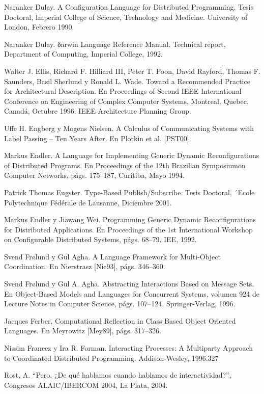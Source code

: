\begin{thebibliography}{1}
{\bibitem{}
Naranker Dulay. A Configuration Language for Distributed Programming.
Tesis Doctoral, Imperial College of Science, Technology and Medicine. University
of London, Febrero 1990.

\bibitem{}
Naranker Dulay. δarwin Language Reference Manual. Technical report,
Department of Computing, Imperial College, 1992.


\bibitem{}
Walter J. Ellis, Richard F. Hilliard III, Peter T. Poon, David
Rayford, Thomas F. Saunders, Basil Sherlund y Ronald L. Wade. Toward a
Recommended Practice for Architectural Description. En Proceedings of Second
IEEE International Conference on Engineering of Complex Computer Systems,
Montreal, Quebec, Canadá, Octubre 1996. IEEE Architecture Planning Group.


\bibitem{}
Uffe H. Engberg y Mogens Nielsen. A Calculus of Communicating Systems
with Label Passing – Ten Years After. En Plotkin et al. [PST00].

\bibitem{} 
Markus Endler. A Language for Implementing Generic Dynamic
Reconfigurations of Distributed Programs. En Proceedings of the 12th Brazilian
Symposiumon Computer Networks, págs. 175–187, Curitiba, Mayo 1994.

\bibitem{}
Patrick Thomas Eugster. Type-Based Publish/Subscribe. Tesis Doctoral,
´Ecole Polytechnique Fédérale de Lausanne, Diciembre 2001.

\bibitem{}
Markus Endler y Jiawang Wei. Programming Generic Dynamic
Reconfigurations for Distributed Applications. En Proceedings of the 1st
International Workshop on Configurable Distributed Systems, págs. 68–79.
IEE, 1992.

\bibitem{} Svend Frølund y Gul Agha. A Language Framework for Multi-Object
Coordination. En Nierstrasz [Nie93], págs. 346–360.

\bibitem{} Svend Frølund y Gul A. Agha. Abstracting Interactions Based on
Message Sets. En Object-Based Models and Languages for Concurrent Systems,
volumen 924 de Lecture Notes in Computer Science, págs. 107–124.
Springer-Verlag, 1996.

\bibitem{} 
Jacques Ferber. Computational Reflection in Class Based Object Oriented
Languages. En Meyrowitz [Mey89], págs. 317–326.

\bibitem{}
Nissim Francez y Ira R. Forman. Interacting Processes: A Multiparty Approach to
Coordinated Distributed Programming. Addison-Wesley, 1996.327

Rost, A. “Pero, ¿De qué hablamos cuando hablamos de interactividad?”,
Congresos ALAIC/IBERCOM 2004, La Plata, 2004.

}
\end{thebibliography}
